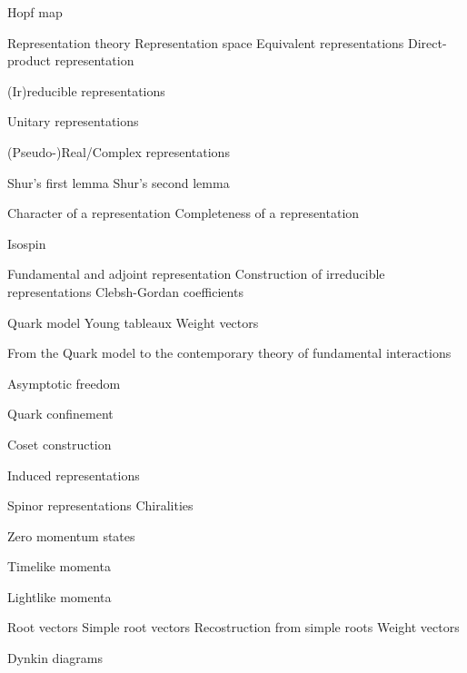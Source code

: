 \begin{multicols}{3}
  Hopf map

  Representation theory
  Representation space
  Equivalent representations
  Direct-product representation

  (Ir)reducible representations

  Unitary representations

  (Pseudo-)Real/Complex representations

  Shur's first lemma
  Shur's second lemma

  Character of a representation
  Completeness of a representation

  Isospin

  Fundamental and adjoint representation
  Construction of irreducible representations
  Clebsh-Gordan coefficients

  Quark model
  Young tableaux
  Weight vectors

  From the Quark model to the contemporary theory of fundamental
  interactions

  Asymptotic freedom

  Quark confinement

  Coset construction

  Induced representations

  Spinor representations
  Chiralities

  Zero momentum states

  Timelike momenta

  Lightlike momenta

  Root vectors
  Simple root vectors
  Recostruction from simple roots
  Weight vectors

  Dynkin diagrams
\end{multicols}


